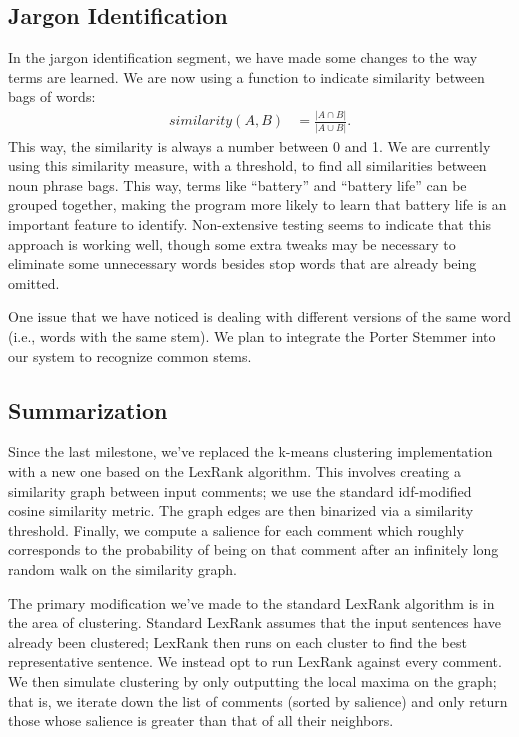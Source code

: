\documentclass{article}
\begin{document}
\subsection{Jargon Identification} %

In the jargon identification segment, we have made some changes to the way terms are learned.  We are now using a function to indicate similarity between bags of words:\begin{align*}
	similarity(A, B) &= \frac{|A\cap B|}{|A\cup B|}.
\end{align*}This way, the similarity is always a number between 0 and 1.  We are currently using this similarity measure, with a threshold, to find all similarities between noun phrase bags.  This way, terms like ``battery'' and ``battery life'' can be grouped together, making the program more likely to learn that battery life is an important feature to identify.  Non-extensive testing seems to indicate that this approach is working well, though some extra tweaks may be necessary to eliminate some unnecessary words besides stop words that are already being omitted.

One issue that we have noticed is dealing with different versions of the same word (i.e., words with the same stem).  We plan to integrate the Porter Stemmer \cite{porter} into our system to recognize common stems.


\subsection{Summarization} %

Since the last milestone, we've replaced the k-means clustering
implementation with a new one based on the LexRank algorithm.
This involves creating a similarity graph between input comments;
we use the standard idf-modified cosine similarity metric. The
graph edges are then binarized via a similarity threshold. Finally,
we compute a salience for each comment which roughly corresponds
to the probability of being on that comment after an infinitely
long random walk on the similarity graph.

The primary modification we've made to the standard LexRank
algorithm is in the area of clustering. Standard LexRank assumes
that the input sentences have already been clustered; LexRank then
runs on each cluster to find the best representative sentence. We
instead opt to run LexRank against every comment. We then simulate
clustering by only outputting the local maxima on the graph; that
is, we iterate down the list of comments (sorted by salience) and
only return those whose salience is greater than that of all their
neighbors.
\end{document}
